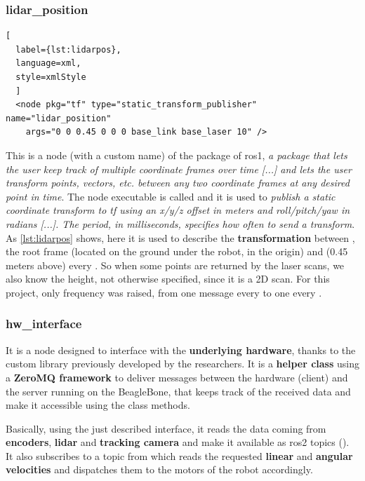 \subsubsection{lidar\_position} %

\begin{lstlisting}[
  label={lst:lidarpos},
  language=xml,
  style=xmlStyle
  ]
  <node pkg="tf" type="static_transform_publisher" name="lidar_position"
    args="0 0 0.45 0 0 0 base_link base_laser 10" />
\end{lstlisting}

This is a node (with a custom name) of the  package of \acrshort{ros}1, \textit{a package that lets the user keep track of multiple coordinate frames over time [...] and lets the user transform points, vectors, etc. between any two coordinate frames at any desired point in time}. \cite{tf} The node executable is called  and it is used to \textit{publish a static coordinate transform to tf using an x/y/z offset in meters and roll/pitch/yaw in radians [...]. The period, in milliseconds, specifies how often to send a transform}. \cite{tf} 
As \autoref{lst:lidarpos} shows, here it is used to describe the \textbf{transformation} between , the root frame (located on the ground under the robot, in the origin) and  (0.45 meters above) every . So when some points are returned by the laser scans, we also know the height, not otherwise specified, since it is a 2D scan. For this project, only frequency was raised, from one message every  to one every .

\subsubsection{hw\_interface}

It is a node designed to interface with the \textbf{underlying hardware}, thanks to the custom  library previously developed by the researchers. It is a \textbf{helper class} using a \textbf{ZeroMQ framework} to deliver messages between the hardware (client) and the server running on the BeagleBone, that keeps track of the received data and make it accessible using the class methods.

Basically, using the just described interface, it reads the data coming from \textbf{encoders}, \textbf{lidar} and \textbf{tracking camera} and make it available as \acrshort{ros}2 topics (). It also subscribes to a  topic from which reads the requested \textbf{linear} and \textbf{angular velocities} and dispatches them to the motors of the robot accordingly.

